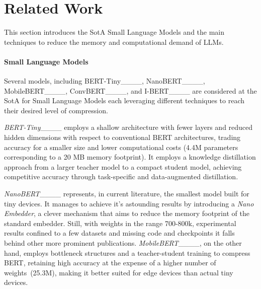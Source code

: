 \section{Related Work}
\label{sec:relatedwork}



This section introduces the SotA Small Language Models and the main techniques to reduce the memory and computational demand of LLMs.

\paragraph{Small Language Models} 
Several models, including BERT-Tiny____, NanoBERT____, MobileBERT____, ConvBERT____, and I-BERT____ are considered at the SotA for Small Language Models each leveraging different techniques to reach their desired level of compression. 


\textit{BERT-Tiny}____ employs a shallow architecture with fewer layers and reduced hidden dimensions with respect to conventional BERT architectures, trading accuracy for a smaller size and lower computational costs (4.4M parameters corresponding to a 20 MB memory footprint). It employs a knowledge distillation approach from a larger teacher model to a compact student model, achieving competitive accuracy through task-specific and data-augmented distillation. 

\textit{NanoBERT}____ represents, in current literature, the smallest model built for tiny devices. It manages to achieve it's astounding results by introducing a \emph{Nano Embedder}, a clever mechanism that aims to reduce the memory footprint of the standard embedder. Still, with weights in the range 700-800k, experimental results confined to a few datasets and missing code and checkpoints it falls behind other more prominent publications. \textit{MobileBERT}____, on the other hand, employs bottleneck structures and a teacher-student training to compress BERT, retaining high accuracy at the expense of a higher number of weights~(25.3M), making it better suited for edge devices than actual tiny devices.

